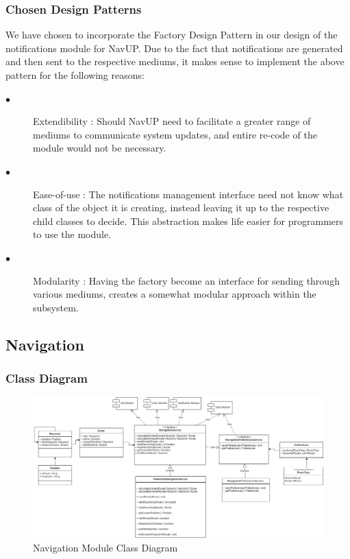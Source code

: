 \documentclass{article}
\begin{document}
        \subsubsection{Chosen Design Patterns}

        We have chosen to incorporate the Factory Design Pattern in our design of the notifications module for NavUP. Due to the fact that notifications are generated and then sent to the respective mediums, it makes sense to implement the above pattern for the following reasons:
		\begin{description}

		\item[$\bullet$]Extendibility : Should NavUP need to facilitate a greater range of mediums to communicate system updates, and entire re-code of the module would not be necessary.

		\item[$\bullet$]Ease-of-use : The notifications management interface need not know what class of the object it is creating, instead leaving it up to the respective child classes to decide. This abstraction makes life easier for programmers to use the module.

		\item[$\bullet$]Modularity : Having the factory become an interface for sending through various mediums, creates a somewhat modular approach within the subsystem.
		\end{description}
    \newpage

    \subsection{Navigation}
        \subsubsection{Class Diagram}
        \begin{figure}[H]
        	\includegraphics[width=\textwidth]{Navigation_Class_Diagram}
            \caption{Navigation Module Class Diagram}
        \end{figure}
\end{document}
